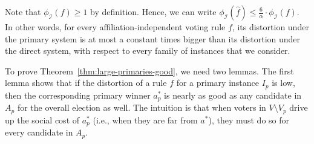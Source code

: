 \documentclass[letterpaper]{article} %
\theoremstyle{definition}
\renewcommand{\hat}{\widehat}
\newcommand{\calI}{\mathcal{I}}
\newcommand{\I}{\calI}
\begin{document}
Note that $\phi_{\I}(f) \ge 1$ by definition. Hence, we can write $\phi_{\I}(\hat{f}) \le \frac{6}{\alpha} \cdot \phi_{\I}(f)$. In other words, for every affiliation-independent voting rule $f$, its distortion under the primary system is at most a constant times bigger than its distortion under the direct system, with respect to every family of instances that we consider. %

%

To prove Theorem~\ref{thm:large-primaries-good}, we need two lemmas. The first lemma shows that if the distortion of a rule $f$ for a primary instance $I_p$ is low, then the corresponding primary winner $a^*_p$ is nearly as good as any candidate in $A_p$ for the overall election as well. The intuition is that when voters in $V \setminus V_p$ drive up the social cost of $a^*_p$ (i.e., when they are far from $a^*$), they must do so for every candidate in $A_p$.
\end{document}
